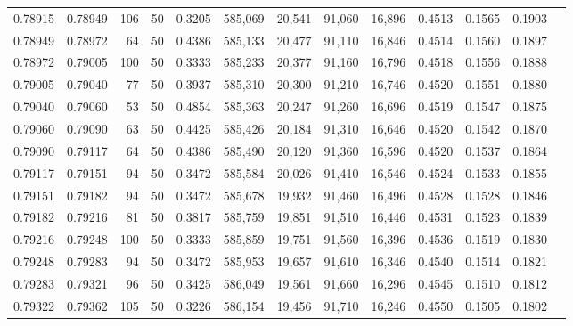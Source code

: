 \begin{tabular}{rrrrrrrrrrrrr}
0.78915 & 0.78949 &   106 &  50 &                                     0.3205 & 585,069 &  20,541 &  91,060 &  16,896 & 0.4513 & 0.1565 & 0.1903 \\
0.78949 & 0.78972 &    64 &  50 &                                     0.4386 & 585,133 &  20,477 &  91,110 &  16,846 & 0.4514 & 0.1560 & 0.1897 \\
0.78972 & 0.79005 &   100 &  50 &                                     0.3333 & 585,233 &  20,377 &  91,160 &  16,796 & 0.4518 & 0.1556 & 0.1888 \\
0.79005 & 0.79040 &    77 &  50 &                                     0.3937 & 585,310 &  20,300 &  91,210 &  16,746 & 0.4520 & 0.1551 & 0.1880 \\
0.79040 & 0.79060 &    53 &  50 &                                     0.4854 & 585,363 &  20,247 &  91,260 &  16,696 & 0.4519 & 0.1547 & 0.1875 \\
0.79060 & 0.79090 &    63 &  50 &                                     0.4425 & 585,426 &  20,184 &  91,310 &  16,646 & 0.4520 & 0.1542 & 0.1870 \\
0.79090 & 0.79117 &    64 &  50 &                                     0.4386 & 585,490 &  20,120 &  91,360 &  16,596 & 0.4520 & 0.1537 & 0.1864 \\
0.79117 & 0.79151 &    94 &  50 &                                     0.3472 & 585,584 &  20,026 &  91,410 &  16,546 & 0.4524 & 0.1533 & 0.1855 \\
0.79151 & 0.79182 &    94 &  50 &                                     0.3472 & 585,678 &  19,932 &  91,460 &  16,496 & 0.4528 & 0.1528 & 0.1846 \\
0.79182 & 0.79216 &    81 &  50 &                                     0.3817 & 585,759 &  19,851 &  91,510 &  16,446 & 0.4531 & 0.1523 & 0.1839 \\
0.79216 & 0.79248 &   100 &  50 &                                     0.3333 & 585,859 &  19,751 &  91,560 &  16,396 & 0.4536 & 0.1519 & 0.1830 \\
0.79248 & 0.79283 &    94 &  50 &                                     0.3472 & 585,953 &  19,657 &  91,610 &  16,346 & 0.4540 & 0.1514 & 0.1821 \\
0.79283 & 0.79321 &    96 &  50 &                                     0.3425 & 586,049 &  19,561 &  91,660 &  16,296 & 0.4545 & 0.1510 & 0.1812 \\
0.79322 & 0.79362 &   105 &  50 &                                     0.3226 & 586,154 &  19,456 &  91,710 &  16,246 & 0.4550 & 0.1505 & 0.1802 \\

\end{tabular}
